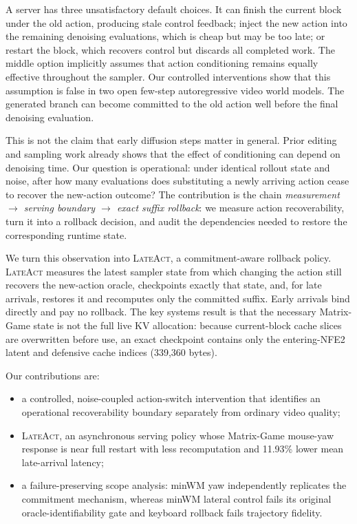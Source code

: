 \documentclass{article}
\newcommand{\method}{\textsc{LateAct}}
\newcommand{\nfe}{\textsc{NFE}}
\begin{document}
A server has three unsatisfactory default choices. It can finish the current
block under the old action, producing stale control feedback; inject the new
action into the remaining denoising evaluations, which is cheap but may be too
late; or restart the block, which recovers control but discards all completed
work. The middle option implicitly assumes that action conditioning remains
equally effective throughout the sampler. Our controlled interventions show
that this assumption is false in two open few-step autoregressive video world
models. The generated branch can become committed to the old action well
before the final denoising evaluation.

This is not the claim that early diffusion steps matter in general. Prior
editing and sampling work already shows that the effect of conditioning can
depend on denoising time. Our question is operational: under identical rollout
state and noise, after how many evaluations does substituting a newly arriving
action cease to recover the new-action outcome? The contribution is the chain
\emph{measurement $\rightarrow$ serving boundary $\rightarrow$ exact suffix
rollback}: we measure action recoverability, turn it into a rollback decision,
and audit the dependencies needed to restore the corresponding runtime state.

We turn this observation into \method{}, a commitment-aware rollback policy.
\method{} measures the latest sampler state from which changing the action
still recovers the new-action oracle, checkpoints exactly that state, and, for
late arrivals, restores it and recomputes only the committed suffix. Early
arrivals bind directly and pay no rollback. The key systems result is that the
necessary Matrix-Game state is not the full live KV allocation: because
current-block cache slices are overwritten before use, an exact checkpoint
contains only the entering-\nfe{}2 latent and defensive cache indices
(339,360 bytes).

Our contributions are:
\begin{itemize}
  \item a controlled, noise-coupled action-switch intervention that identifies
  an operational recoverability boundary separately from ordinary video
  quality;
  \item \method{}, an asynchronous serving policy whose Matrix-Game
  mouse-yaw response is near full restart with less recomputation and
  11.93\% lower mean late-arrival latency;
  \item a failure-preserving scope analysis: minWM yaw independently
  replicates the commitment mechanism, whereas minWM lateral control fails its original
  oracle-identifiability gate and keyboard rollback fails trajectory fidelity.
\end{itemize}
\end{document}
